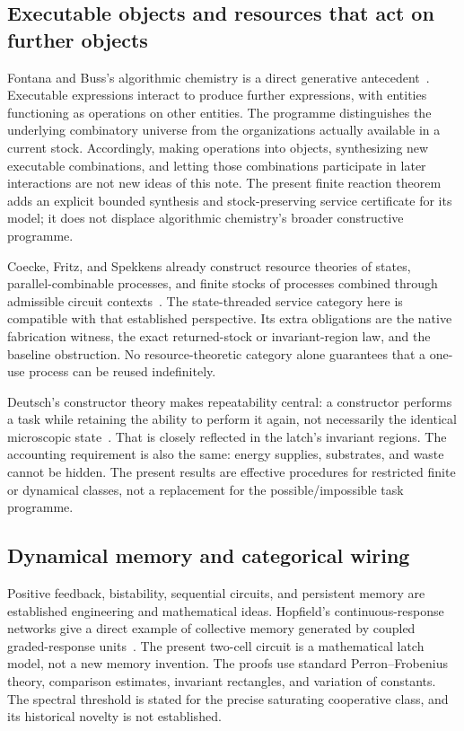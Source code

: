 \documentclass[11pt]{article}
\theoremstyle{definition}
\theoremstyle{remark}
\begin{document}
\subsection{Executable objects and resources that act on further objects}
Fontana and Buss's algorithmic chemistry is a direct generative
antecedent~\cite{Fontana1992,FontanaBuss1994}. Executable expressions
interact to produce further expressions, with entities functioning as
operations on other entities. The programme distinguishes the underlying
combinatory universe from the organizations actually available in a
current stock. Accordingly, making operations into objects, synthesizing
new executable combinations, and letting those combinations participate
in later interactions are not new ideas of this note. The present
finite reaction theorem adds an explicit bounded synthesis and
stock-preserving service certificate for its model; it does not displace
algorithmic chemistry's broader constructive programme.

Coecke, Fritz, and Spekkens already construct resource theories of states,
parallel-combinable processes, and finite stocks of processes combined
through admissible circuit contexts~\cite{CFS2016}. The state-threaded
service category here is compatible with that established perspective.
Its extra obligations are the native fabrication witness, the exact
returned-stock or invariant-region law, and the baseline obstruction.
No resource-theoretic category alone guarantees that a one-use process
can be reused indefinitely.

Deutsch's constructor theory makes repeatability central: a constructor
performs a task while retaining the ability to perform it again, not
necessarily the identical microscopic state~\cite{Deutsch2013}. That
is closely reflected in the latch's invariant regions. The accounting
requirement is also the same: energy supplies, substrates, and waste
cannot be hidden. The present results are effective procedures for
restricted finite or dynamical classes, not a replacement for the
possible/impossible task programme.

\subsection{Dynamical memory and categorical wiring}
Positive feedback, bistability, sequential circuits, and persistent
memory are established engineering and mathematical ideas. Hopfield's
continuous-response networks give a direct example of collective
memory generated by coupled graded-response units~\cite{Hopfield1984}.
The present two-cell circuit is a mathematical latch model, not a new
memory invention. The proofs use standard Perron--Frobenius theory,
comparison estimates, invariant rectangles, and variation of constants.
The spectral threshold is stated for the precise saturating cooperative
class, and its historical novelty is not established.
\end{document}
